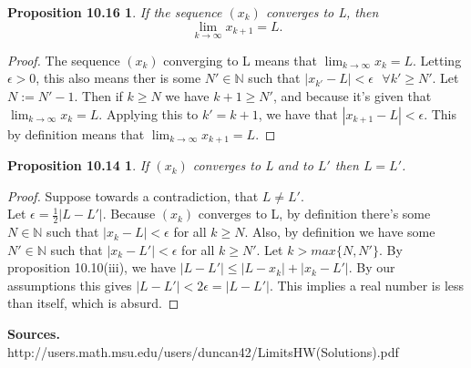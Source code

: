 \documentclass[12pt]{amsart}
\newcommand{\N}{\mathbb{N}}
\begin{document}
\newtheorem*{prop10.16}{Proposition 10.16}
\begin{prop10.16}
	If the sequence $(x_k)$ converges to L, then $$\lim_{k \to \infty} x_{k+1} = L.$$
\end{prop10.16}

\begin{proof}
	The sequence $(x_k)$ converging to L means that $\displaystyle{\lim_{k \to \infty}} x_{k} = L.$ Letting $\epsilon > 0$, this also means ther is some $N' \in \N$ such that $|x_{k'} - L| < \epsilon \textrm{   }\forall k' \geq N'$. Let $N := N' - 1$. Then if $k \geq N$ we have $k + 1 \geq N'$, and because it's given that $\displaystyle{\lim_{k \to \infty}} x_{k} = L.$ Applying this to $k' = k + 1$, we have that $|x_{k+1} - L| < \epsilon$. This by definition means that $\displaystyle{\lim_{k \to \infty}} x_{k+1} = L.$
\end{proof}

\newtheorem*{prop10.14}{Proposition 10.14}
\begin{prop10.14}
	If $(x_k)$ converges to L and to $L'$ then $L = L'$.
\end{prop10.14}

\begin{proof}
	Suppose towards a contradiction, that $L \neq L'$.
	\\ Let $\epsilon = \frac{1}{2}|L - L'|$. Because $(x_k)$ converges to L, by definition there's some $N \in \N$ such that $|x_k - L| < \epsilon$ for all $k \geq N$. Also, by definition we have some $N' \in \N$ such that $|x_k - L'| < \epsilon$ for all $k \geq N'$. Let $k > max\{N,N'\}$. By proposition 10.10(iii), we have $|L - L'| \leq |L - x_k| + |x_k - L'|.$ By our assumptions this gives $|L - L'| < 2\epsilon = |L - L'|$. This implies a real number is less than itself, which is absurd.
\end{proof}

\noindent\textbf{Sources.}
\\http://users.math.msu.edu/users/duncan42/LimitsHW(Solutions).pdf
\end{document}

